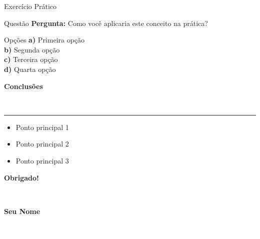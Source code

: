 \documentclass[aspectratio=169]{beamer}
\begin{document}
\layoutexercicio

\begin{frame}{Exercício Prático}
    \begin{exampleblock}{Questão}
        \textbf{Pergunta:} Como você aplicaria este conceito na prática?
    \end{exampleblock}
    
    \begin{block}{Opções}
        \textbf{a)} Primeira opção\\
        \textbf{b)} Segunda opção\\
        \textbf{c)} Terceira opção\\
        \textbf{d)} Quarta opção
    \end{block}
\end{frame}

\layoutlimpo

\begin{frame}
    \begin{center}
        \vfill
        \Huge{\textcolor{newtanorange}{\textbf{Conclusões}}}
        \vspace{1cm}
        
        \Large{\textcolor{white}{Principais pontos abordados}}
        \vspace{1cm}
        
        \textcolor{white}{\rule{12cm}{2pt}}
        \vspace{1cm}
        
        \begin{itemize}
            \item Ponto principal 1
            \item Ponto principal 2
            \item Ponto principal 3
        \end{itemize}
        \vfill
    \end{center}
\end{frame}

\begin{frame}
    \begin{center}
        \vfill
        \Huge{\textcolor{newtanorange}{\textbf{Obrigado!}}}
        \vspace{1cm}
        
        \newtonlogo[3cm]
        
        \vspace{1cm}
        \Large{\textcolor{white}{Perguntas?}}
        
        \vspace{1.5cm}
        \textcolor{newtanorange}{\textbf{Seu Nome}}
        \\[0.3cm]
        \textcolor{white}{Centro Universitário Newton Paiva}
        \\[0.3cm]
        \textcolor{white}{\small seu.email@newtonpaiva.br}
        \vfill
    \end{center}
\end{frame}
\end{document}
